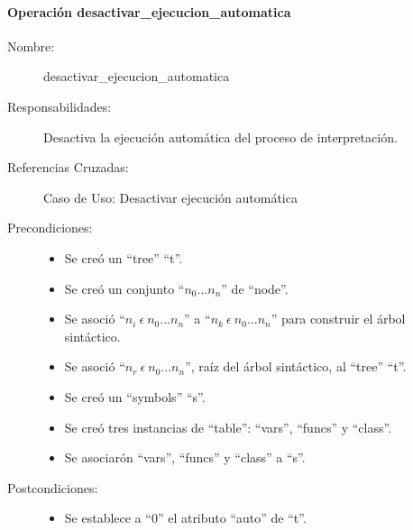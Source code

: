 \paragraph{Operación desactivar\_ejecucion\_automatica}
\FloatBarrier
\begin{framed}
	\begin{description}
		\item [Nombre:] desactivar\_ejecucion\_automatica
		\item [Responsabilidades:] Desactiva la ejecución automática del proceso de interpretación.
		\item [Referencias Cruzadas: ] Caso de Uso: Desactivar ejecución automática
      \item [Precondiciones:] \hfill
         \begin {itemize}
         \item Se creó un ``tree'' ``t''.
         \item Se creó un conjunto ``$n_0...n_n$'' de ``node''.
         \item Se asoció ``$n_i\ \epsilon\ n_0...n_n$'' a ``$n_k\ \epsilon\ n_0...n_n$'' para construir el árbol sintáctico.
         \item Se asoció  ``$n_r\ \epsilon\ n_0...n_n$'', raíz del árbol sintáctico, al ``tree'' ``t''.
         \item Se creó un ``symbols'' ``s''.
         \item Se creó tres instancias de ``table'': ``vars'', ``funcs'' y ``class''.
         \item Se asociarón ``vars'', ``funcs'' y ``class'' a ``s''.
      \end{itemize}
      \item [Postcondiciones:] \hfill
      \begin {itemize}
         \item Se establece a ``0'' el atributo ``auto'' de ``t''.
      \end{itemize}
	\end{description} 
\end{framed}
\FloatBarrier

